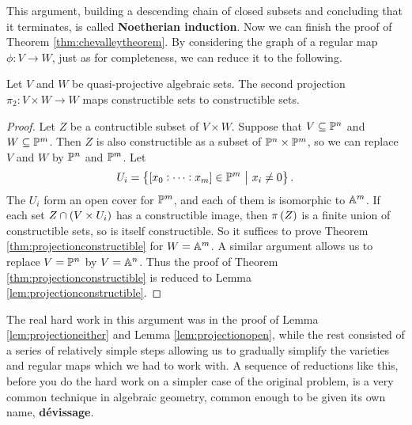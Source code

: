 This argument, building a descending chain of closed subsets and concluding that it terminates, is called \textbf{Noetherian induction}. Now we can finish the proof of Theorem \ref{thm:chevalleytheorem}. By considering the graph of a regular map $ \phi : V \to W $, just as for completeness, we can reduce it to the following.

\begin{theorem}
\label{thm:projectionconstructible}
Let $ V $ and $ W $ be quasi-projective algebraic sets. The second projection $ \pi_2 : V \times W \to W $ maps constructible sets to constructible sets.
\end{theorem}

\begin{proof}
Let $ Z $ be a contructible subset of $ V \times W $. Suppose that $ V \subseteq \PP^n $ and $ W \subseteq \PP^m $. Then $ Z $ is also constructible as a subset of $ \PP^n \times \PP^m $, so we can replace $ V $ and $ W $ by $ \PP^n $ and $ \PP^m $. Let
$$ U_i = \cbr{\sbr{x_0 : \dots : x_m} \in \PP^m \st x_i \ne 0}. $$
The $ U_i $ form an open cover for $ \PP^m $, and each of them is isomorphic to $ \AA^m $. If each set $ Z \cap \br{V \times U_i} $ has a constructible image, then $ \pi\br{Z} $ is a finite union of constructible sets, so is itself constructible. So it suffices to prove Theorem \ref{thm:projectionconstructible} for $ W = \AA^m $. A similar argument allows us to replace $ V = \PP^n $ by $ V = \AA^n $. Thus the proof of Theorem \ref{thm:projectionconstructible} is reduced to Lemma \ref{lem:projectionconstructible}.
\end{proof}

The real hard work in this argument was in the proof of Lemma \ref{lem:projectioneither} and Lemma \ref{lem:projectionopen}, while the rest consisted of a series of relatively simple steps allowing us to gradually simplify the varieties and regular maps which we had to work with. A sequence of reductions like this, before you do the hard work on a simpler case of the original problem, is a very common technique in algebraic geometry, common enough to be given its own name, \textbf{d\'evissage}.

